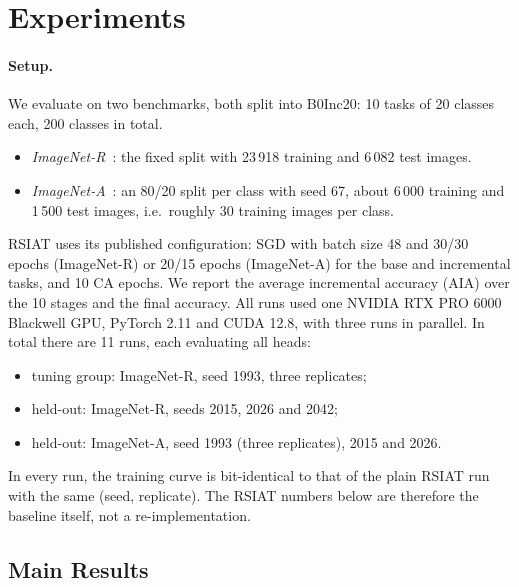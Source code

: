\section{Experiments}
\label{sec:experiments}

\paragraph{Setup.}
We evaluate on two benchmarks, both split into B0Inc20: 10 tasks of 20
classes each, 200 classes in total.
\begin{itemize}
  \item \emph{ImageNet-R}~\cite{hendrycks2021many}: the fixed split with
    23\,918 training and 6\,082 test images.
  \item \emph{ImageNet-A}~\cite{hendrycks2021nae}: an 80/20 split per class
    with seed 67, about 6\,000 training and 1\,500 test images, i.e.\ roughly
    30 training images per class.
\end{itemize}
RSIAT uses its published configuration: SGD with batch size 48 and 30/30
epochs (ImageNet-R) or 20/15 epochs (ImageNet-A) for the base and incremental
tasks, and 10 CA epochs. We report the average incremental accuracy (AIA)
over the 10 stages and the final accuracy. All runs used one NVIDIA RTX PRO
6000 Blackwell GPU, PyTorch 2.11 and CUDA 12.8, with three runs in parallel.
In total there are 11 runs, each evaluating all heads:
\begin{itemize}
  \item tuning group: ImageNet-R, seed 1993, three replicates;
  \item held-out: ImageNet-R, seeds 2015, 2026 and 2042;
  \item held-out: ImageNet-A, seed 1993 (three replicates), 2015 and 2026.
\end{itemize}
In every run, the training curve is bit-identical to that of the plain RSIAT
run with the same (seed, replicate). The RSIAT numbers below are therefore
the baseline itself, not a re-implementation.

\subsection{Main Results}

